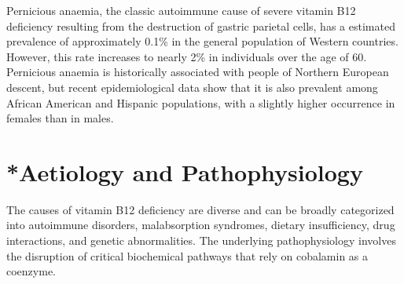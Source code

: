 Pernicious anaemia, the classic autoimmune cause of severe vitamin B12 deficiency resulting from the destruction of gastric parietal cells, has a estimated prevalence of approximately 0.1\% in the general population of Western countries. However, this rate increases to nearly 2\% in individuals over the age of 60. Pernicious anaemia is historically associated with people of Northern European descent, but recent epidemiological data show that it is also prevalent among African American and Hispanic populations, with a slightly higher occurrence in females than in males.

\section{*Aetiology and Pathophysiology}
The causes of vitamin B12 deficiency are diverse and can be broadly categorized into autoimmune disorders, malabsorption syndromes, dietary insufficiency, drug interactions, and genetic abnormalities. The underlying pathophysiology involves the disruption of critical biochemical pathways that rely on cobalamin as a coenzyme.

